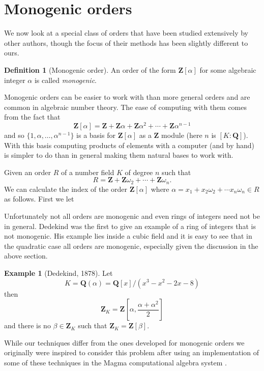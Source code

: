 \documentclass[12pt,a4paper,abstracton,bibtotoc]{scrreprt}
\theoremstyle{definition}
\newtheorem{defn}{Definition}
\newtheorem{ex}{Example}
\newcommand{\QQ}{\mathbf{Q}}
\newcommand{\ZZ}{\mathbf{Z}}
\begin{document}

\section{Monogenic orders}

We now look at a special class of orders that have been studied extensively by other authors, though the focus of their methods has been slightly different to ours.

\begin{defn}[Monogenic order]
An order of the form $\ZZ[\alpha]$ for some algebraic integer $\alpha$ is called \emph{monogenic}.
\end{defn}

Monogenic orders can be easier to work with than more general orders and are common in algebraic number theory.
The ease of computing with them comes from the fact that
\[
\ZZ[\alpha] = \ZZ + \ZZ\alpha + \ZZ\alpha^2 + \cdots + \ZZ\alpha^{n-1}
\]
and so $\{1,\alpha,\ldots,\alpha^{n-1}\}$ is a basis for $\ZZ[\alpha]$ as a $\ZZ$ module (here $n$ is $[K : \QQ]$).
With this basis computing products of elements with a computer (and by hand) is simpler to do than in general making them natural bases to work with.

Given an order $R$ of a number field $K$ of degree $n$ such that
\[
R = \ZZ + \ZZ\omega_2 + \cdots + \ZZ\omega_n.
\]
We can calculate the index of the order $\ZZ[\alpha]$ where $\alpha = x_1 + x_2\omega_2 + \cdots x_n\omega_n\in R$ as follows.
First we let

Unfortunately not all orders are monogenic and even rings of integers need not be in general.
Dedekind was the first to give an example of a ring of integers that is not monogenic.
His example lies inside a cubic field and it is easy to see that in the quadratic case all orders are monogenic, especially given the discussion in the above section.

\begin{ex}[Dedekind, 1878]
Let 
\[
K = \QQ(\alpha) = \QQ[x]/(x^3 -x^2 -2x-8)
\]
then
\[
\ZZ_K=\ZZ\left[ \alpha,\frac{\alpha + \alpha^2}{2}\right]
\]
and there is no $\beta\in \ZZ_K$ such that $\ZZ_K=\ZZ[\beta]$. %
\end{ex}


While our techniques differ from the ones developed for monogenic orders we originally were inspired to consider this problem after using an implementation of some of these techniques in the Magma computational algebra system \cite{magma}.
\end{document}
